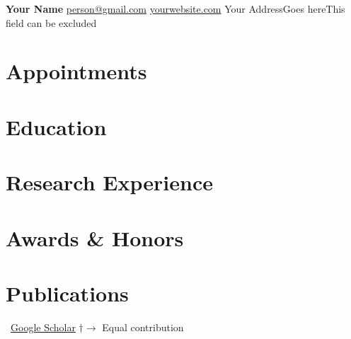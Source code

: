 \documentclass[11pt]{article} %
\newcommand*{\pubnewline}{\unskip\nobreak\hfil\break}
\let\\\pubnewline
\newcommand{\mytitle}[4]{
  \begin{center}
    \Large\textbf{#1}\normalsize \\ %
    \href{mailto:#2}{#2} \\ %
    \href{https://#3}{#3} \\ %
    #4 %
  \end{center}
}
\begin{document}
\mytitle{Your Name}{person@gmail.com}{yourwebsite.com}{Your Address\\Goes here\\This field can be excluded} %


\RaggedRight


\section*{Appointments}
\label{appointments}


\section*{Education}
\label{education}


\section*{Research Experience}
\label{exp_research}


\section*{Awards \& Honors}
\label{awards}



\section*{Publications}
\label{pubs}

\vspace{-.75em}
\small
\faGoogle~\href{https://scholar.google.com/}{Google Scholar}\\
$\dagger \rightarrow$ Equal contribution
\normalsize

\nocite{*} %
\end{document}
